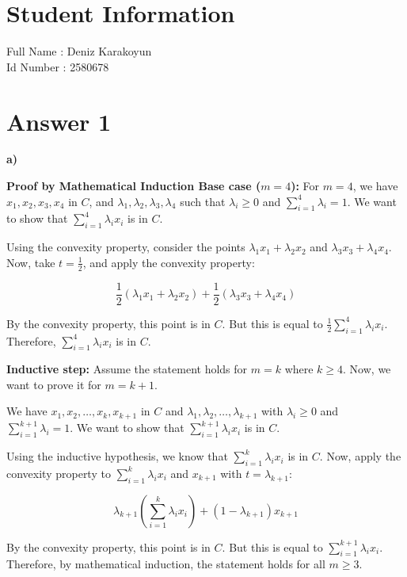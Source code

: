 \documentclass[12pt]{article}
\begin{document}
\section*{Student Information } 
Full Name :  Deniz Karakoyun\\
Id Number :  2580678\\

\section*{Answer 1}
\textbf{a)} 

\textbf{Proof by Mathematical Induction Base case (\( m = 4 \)):}
For \( m = 4 \), we have \( x_1, x_2, x_3, x_4 \) in \( C \), and \( \lambda_1, \lambda_2, \lambda_3, \lambda_4 \) such that \( \lambda_i \geq 0 \) and \( \sum_{i=1}^{4} \lambda_i = 1 \). We want to show that \( \sum_{i=1}^{4} \lambda_i x_i \) is in \( C \).

Using the convexity property, consider the points \( \lambda_1 x_1 + \lambda_2 x_2 \) and \( \lambda_3 x_3 + \lambda_4 x_4 \). Now, take \( t = \frac{1}{2} \), and apply the convexity property:

\[ \frac{1}{2}(\lambda_1 x_1 + \lambda_2 x_2) + \frac{1}{2}(\lambda_3 x_3 + \lambda_4 x_4) \]

By the convexity property, this point is in \( C \). But this is equal to \( \frac{1}{2} \sum_{i=1}^{4} \lambda_i x_i \). Therefore, \( \sum_{i=1}^{4} \lambda_i x_i \) is in \( C \).

\textbf{Inductive step:}
Assume the statement holds for \( m = k \) where \( k \geq 4 \). Now, we want to prove it for \( m = k+1 \).

We have \( x_1, x_2, \ldots, x_k, x_{k+1} \) in \( C \) and \( \lambda_1, \lambda_2, \ldots, \lambda_{k+1} \) with \( \lambda_i \geq 0 \) and \( \sum_{i=1}^{k+1} \lambda_i = 1 \). We want to show that \( \sum_{i=1}^{k+1} \lambda_i x_i \) is in \( C \).

Using the inductive hypothesis, we know that \( \sum_{i=1}^{k} \lambda_i x_i \) is in \( C \). Now, apply the convexity property to \( \sum_{i=1}^{k} \lambda_i x_i \) and \( x_{k+1} \) with \( t = \lambda_{k+1} \):

\[ \lambda_{k+1}(\sum_{i=1}^{k} \lambda_i x_i) + (1-\lambda_{k+1})x_{k+1} \]

By the convexity property, this point is in \( C \). But this is equal to \( \sum_{i=1}^{k+1} \lambda_i x_i \). Therefore, by mathematical induction, the statement holds for all \( m \geq 3 \).
\end{document}
